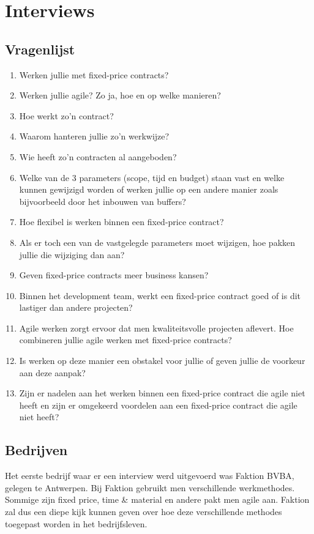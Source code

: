 \documentclass{hogent-article}
\begin{document}
	
	\section{Interviews}
	\subsection{Vragenlijst}
	\label{vragen}
	\begin{enumerate}
		\item Werken jullie met fixed-price contracts?
		\item Werken jullie agile? Zo ja, hoe en op welke manieren?
		\item Hoe werkt zo'n contract?
		\item Waarom hanteren jullie zo’n werkwijze?
		\item Wie heeft zo'n contracten al aangeboden?
		\item Welke van de 3 parameters (scope, tijd en budget) staan vast en welke kunnen gewijzigd worden of werken jullie op een andere manier zoals bijvoorbeeld door het inbouwen van buffers?
		\item Hoe flexibel is werken binnen een fixed-price contract?
		\item Als er toch een van de vastgelegde parameters moet wijzigen, hoe pakken jullie die wijziging dan aan?
		\item Geven fixed-price contracts meer business kansen?
		\item Binnen het development team, werkt een fixed-price contract goed of is dit lastiger dan andere projecten?
		\item Agile werken zorgt ervoor dat men kwaliteitsvolle projecten aflevert. Hoe combineren jullie agile werken met fixed-price contracts?
		\item Is werken op deze manier een obstakel voor jullie of geven jullie de voorkeur aan deze aanpak?
		\item Zijn er nadelen aan het werken binnen een fixed-price contract die agile niet heeft en zijn er omgekeerd voordelen aan een fixed-price contract die agile niet heeft?
	\end{enumerate}
		
    \subsection{Bedrijven}
    Het eerste bedrijf waar er een interview werd uitgevoerd was Faktion BVBA, gelegen te Antwerpen. Bij Faktion gebruikt men verschillende werkmethodes. Sommige zijn fixed price, time \& material en andere pakt men agile aan. Faktion zal dus een diepe kijk kunnen geven over hoe deze verschillende methodes toegepast worden in het bedrijfsleven.
    
\end{document}
